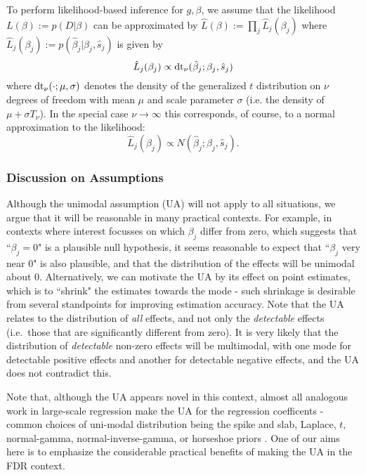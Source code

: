 \documentclass[11pt]{article}
\def\bhat{\hat{\beta}}
\def\shat{\hat{s}}
\begin{document}
To perform likelihood-based inference for $g,\beta$, we assume that the likelihood $L(\beta) := p(D | \beta)$ can be approximated by 
$\hat{L}(\beta) := \prod_j \hat{L}_j(\beta_j)$ where
 $\hat{L}_j(\beta_j) := p(\bhat_j | \beta_j, \shat_j)$ is given by 
  \begin{equation} \label{eqn:lik}
 \hat{L}_j(\beta_j) \propto \dt_\nu(\bhat_j; \beta_j, \shat_j)
 \end{equation}
 where $\text{dt}_\nu(\cdot; \mu,\sigma)$ denotes the density of the generalized $t$ distribution on $\nu$ degrees of freedom with mean $\mu$ and scale parameter $\sigma$ (i.e. the density of $\mu+\sigma T_\nu$). In the special case $\nu \rightarrow \infty$ this corresponds, of course, to a normal approximation to the likelihood:
  \begin{equation} \label{eqn:normlik}
 \hat{L}_j(\beta_j) \propto N(\bhat_j; \beta_j, \shat_j).
 \end{equation}
 
  
 \subsubsection*{Discussion on Assumptions}
 
Although the unimodal assumption (UA) will not apply to all situations, we argue that it will be reasonable in many practical contexts. 
For example, in contexts where interest focusses on which $\beta_j$ differ from zero, which suggests that ``$\beta_j=0$" is a plausible null hypothesis,  
it seems reasonable to expect that ``$\beta_j$ very near 0" is also plausible, and that the distribution of the effects will be unimodal about 0. 
Alternatively, we can motivate  the UA by its effect on point estimates, which is to ``shrink" the estimates towards the mode - 
such shrinkage is desirable from several standpoints for improving estimation accuracy. 
Note that the UA relates to the distribution of {\it all} effects, and not only the {\it detectable} effects (i.e.~those that are significantly different from zero). It is very likely that the distribution of {\it detectable} non-zero effects will be multimodal, with one mode for detectable positive effects and another for detectable negative effects, and the UA does not contradict this.

Note that, although the UA appears novel in this context,
almost all analogous work in large-scale regression make the UA for the regression coefficents - 
common choices of uni-modal distribution being the spike and slab, Laplace, $t$, normal-gamma, normal-inverse-gamma, or horseshoe priors \cite{}.
One of our aims here is to emphasize the considerable practical benefits of making the UA in the FDR context.
\end{document}
